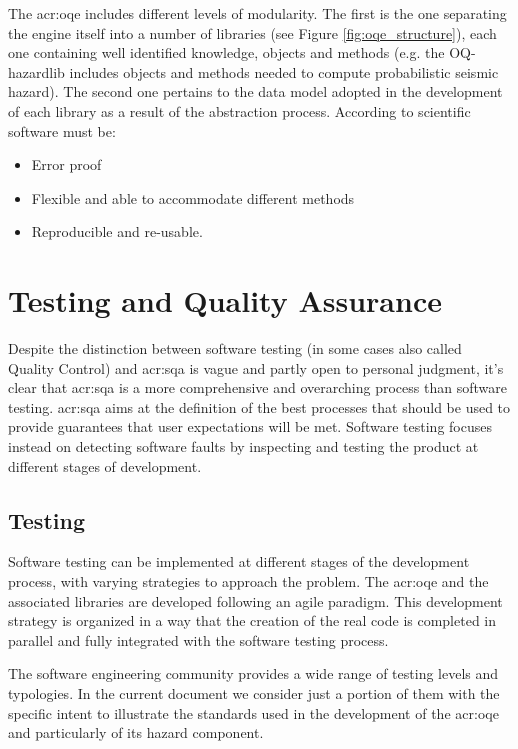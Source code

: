 % 
The \gls{acr:oqe} includes different levels of modularity. 
The first is the one separating the engine itself into a number of 
libraries (see Figure \ref{fig:oqe_structure}), each one containing well 
identified knowledge, objects and methods (e.g. the OQ-hazardlib  
includes objects and methods needed to compute probabilistic 
seismic hazard). 
% 
The second one pertains to the data model adopted in the development 
of each library as a result of the abstraction process.
%
According to \textcite{berkes2012} scientific software must be:
\begin{itemize}
\item Error proof
\item Flexible and able to accommodate different methods
\item Reproducible and re-usable. 
\end{itemize}
%
\section{Testing and Quality Assurance}
Despite the distinction between software testing (in some cases also called 
Quality Control) and \gls{acr:sqa} is vague and partly open to personal 
judgment, it's clear that \gls{acr:sqa} is a more comprehensive and 
overarching process than software testing. 
%
\gls{acr:sqa} aims at the definition of the best processes  
that should be used to provide guarantees that user expectations will 
be met. 
% 
Software testing focuses instead on detecting software faults by inspecting 
and testing the product at different stages of development.
%
\subsection{Testing}
Software testing can be implemented at different stages of the development 
process, with varying strategies to approach the problem.
%
The \gls{acr:oqe} and the associated libraries are developed following an 
agile paradigm. This development strategy is organized in a way that 
the creation of the real code is completed in parallel and fully 
integrated with the software testing process.

The software engineering community provides a wide range of testing levels
and typologies. In the current document we consider just a portion of them
with the specific intent to illustrate the standards used in the 
development of the \gls{acr:oqe} and particularly of its hazard component.
%
